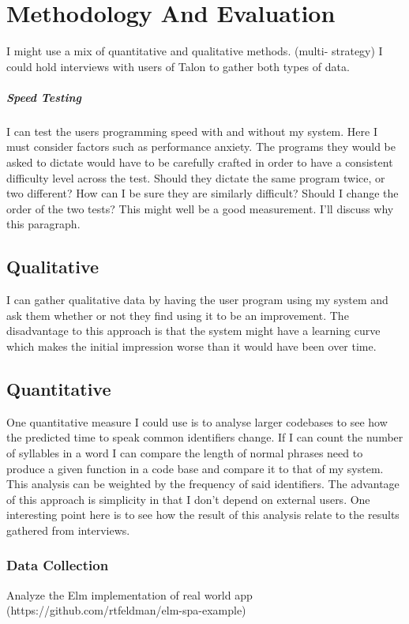 \documentclass[a4paper,english]{ifimaster}
\begin{document}
\chapter{Methodology And Evaluation}
I might use a mix of quantitative and qualitative methods. (multi- strategy) %
I could hold interviews with users of Talon to gather both types of data.

\paragraph{Speed Testing}
I can test the users programming speed with and without my system.
Here I must consider factors such as performance anxiety.
The programs they would be asked to dictate would have to be carefully crafted in order to have a consistent difficulty level
across the test. 
Should they dictate the same program twice, or two different? How can I be sure they are similarly difficult?
Should I change the order of the two tests?
This might well be a good measurement. I'll discuss why this paragraph.


\section{Qualitative}
I can gather qualitative data by having the user program using my system and ask them whether or not they find using it to be an improvement.
The disadvantage to this approach is that the system might have a learning curve which makes the initial impression
worse than it would have been over time.

\section{Quantitative}
One quantitative measure I could use is to analyse larger codebases to see how the predicted time to speak common identifiers change.
If I can count the number of syllables in a word I can compare the length of normal phrases need to produce a given function in a code base and compare
it to that of my system. This analysis can be weighted by the frequency of said identifiers.
The advantage of this approach is simplicity in that I don't depend on external users.
One interesting point here is to see how the result of this analysis relate to the results gathered from interviews.
\subsection{Data Collection}
Analyze the Elm implementation of real world app (https://github.com/rtfeldman/elm-spa-example)
\end{document}
